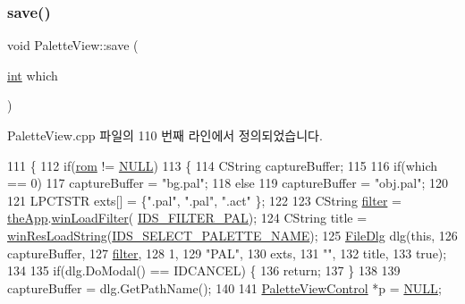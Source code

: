 \subsubsection{\texorpdfstring{save()}{save()}}
{\footnotesize\ttfamily void Palette\+View\+::save (\begin{DoxyParamCaption}\item[{\mbox{\hyperlink{_util_8cpp_a0ef32aa8672df19503a49fab2d0c8071}{int}}}]{which }\end{DoxyParamCaption})}



Palette\+View.\+cpp 파일의 110 번째 라인에서 정의되었습니다.


\begin{DoxyCode}
111 \{
112   \textcolor{keywordflow}{if}(\mbox{\hyperlink{_globals_8cpp_adafc6ed627110c42f3893c9783f55320}{rom}} != \mbox{\hyperlink{getopt1_8c_a070d2ce7b6bb7e5c05602aa8c308d0c4}{NULL}})
113   \{
114     CString captureBuffer;
115 
116     \textcolor{keywordflow}{if}(which == 0)
117       captureBuffer = \textcolor{stringliteral}{"bg.pal"};
118     \textcolor{keywordflow}{else}
119       captureBuffer = \textcolor{stringliteral}{"obj.pal"};
120 
121     LPCTSTR exts[] = \{\textcolor{stringliteral}{".pal"}, \textcolor{stringliteral}{".pal"}, \textcolor{stringliteral}{".act"} \};
122   
123     CString \mbox{\hyperlink{_s_d_l_8cpp_af0122ee4312107103b580a98c74a4ea6}{filter}} = \mbox{\hyperlink{_v_b_a_8cpp_a8095a9d06b37a7efe3723f3218ad8fb3}{theApp}}.\mbox{\hyperlink{class_v_b_a_a228edf26b0dc4129658c174ee5a3c27c}{winLoadFilter}}(
      \mbox{\hyperlink{resource_8h_a65a0ab73214f4021e52db11beee73f70}{IDS\_FILTER\_PAL}});
124     CString title = \mbox{\hyperlink{_win_res_util_8cpp_a416e85e80ab9b01376e87251c83d1a5a}{winResLoadString}}(\mbox{\hyperlink{resource_8h_ae1ae47cd897a7fa4d25f3ce304604cc2}{IDS\_SELECT\_PALETTE\_NAME}});
125     \mbox{\hyperlink{class_file_dlg}{FileDlg}} dlg(\textcolor{keyword}{this},
126                 captureBuffer,
127                 \mbox{\hyperlink{_s_d_l_8cpp_af0122ee4312107103b580a98c74a4ea6}{filter}},
128                 1,
129                 \textcolor{stringliteral}{"PAL"},
130                 exts,
131                 \textcolor{stringliteral}{""},
132                 title,
133                 \textcolor{keyword}{true});
134 
135     \textcolor{keywordflow}{if}(dlg.DoModal() == IDCANCEL) \{
136       \textcolor{keywordflow}{return};
137     \}
138 
139     captureBuffer = dlg.GetPathName();
140 
141     \mbox{\hyperlink{class_palette_view_control}{PaletteViewControl}} *p = \mbox{\hyperlink{getopt1_8c_a070d2ce7b6bb7e5c05602aa8c308d0c4}{NULL}};

\end{DoxyCode}
